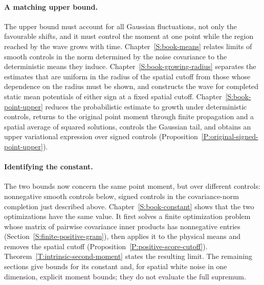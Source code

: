 \paragraph{A matching upper bound.}
The upper bound must account for all Gaussian fluctuations, not only the
favourable shifts, and it must control the moment at one point while the region
reached by the wave grows with time. Chapter~\ref{S:book-means} relates limits of smooth controls in the norm determined by the noise covariance to the deterministic means they induce. Chapter~\ref{S:book-growing-radius} separates the estimates that are
uniform in the radius of the spatial cutoff from those whose dependence on the radius must be shown, and constructs the wave for completed static mean potentials of either sign at a fixed spatial cutoff. Chapter~\ref{S:book-point-upper} reduces the probabilistic estimate to
growth under deterministic controls, returns to the original point moment through finite propagation and a spatial average of squared solutions, controls the Gaussian tail, and obtains an upper
variational expression over signed controls
(Proposition~\ref{P:original-signed-point-upper}).

\paragraph{Identifying the constant.}
The two bounds now concern the same point moment, but over different controls:
nonnegative smooth controls below, signed controls in the covariance-norm completion just described above.
Chapter~\ref{S:book-constant} shows that the two optimizations have the same
value. It first solves a finite optimization problem whose matrix of pairwise covariance inner products has nonnegative entries (Section~\ref{S:finite-positive-gram}), then applies it to
the physical means and removes the spatial cutoff
(Proposition~\ref{P:positive-score-cutoff}). Theorem~\ref{T:intrinsic-second-moment}
states the resulting limit. The remaining sections give bounds for its constant
and, for spatial white noise in one dimension, explicit moment bounds; they do
not evaluate the full supremum.

